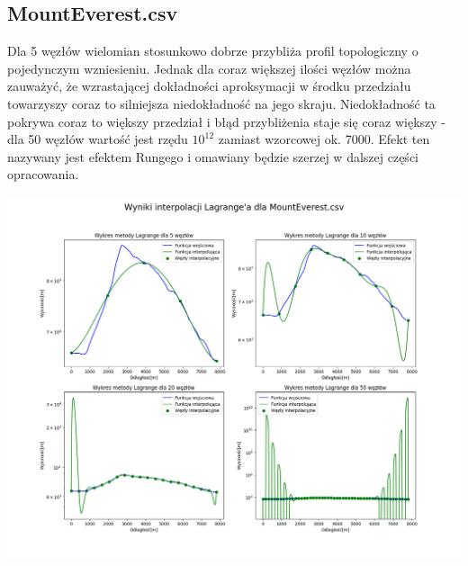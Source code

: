 \documentclass[a4paper,12pt]{article}
\begin{document}
	\subsection{MountEverest.csv}
	Dla 5 węzłów wielomian stosunkowo dobrze przybliża profil topologiczny o pojedynczym wzniesieniu. Jednak dla coraz większej ilości węzłów można zauważyć, że wzrastającej dokładności aproksymacji w środku przedziału towarzyszy coraz to silniejsza niedokładność na jego skraju. Niedokładność ta pokrywa coraz to większy przedział i błąd przybliżenia staje się coraz większy - dla 50 węzłów wartość jest rzędu $10^{12}$ zamiast wzorcowej ok. 7000. Efekt ten nazywany jest efektem Rungego i omawiany będzie szerzej w dalszej części opracowania.
	\begin{center}
        \includegraphics[scale=0.4]{../charts/lagrange_MountEverest.png}
    \end{center}
	
	\newpage
\end{document}

